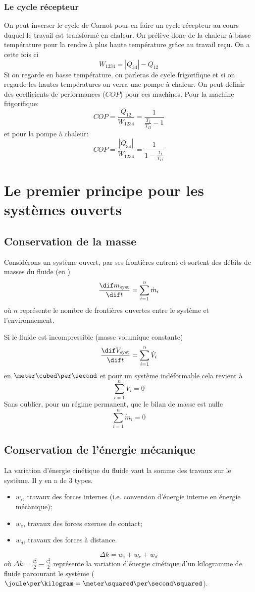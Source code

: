 \subsubsection{Le cycle récepteur}
On peut inverser le cycle de Carnot pour en faire
un cycle récepteur au cours duquel le travail est transformé en chaleur.
On prélève donc de la chaleur à basse température pour
la rendre à plus haute température grâce au travail reçu.
On a cette fois ci
\[ W_{1234} = |Q_{34}|-Q_{12} \]
Si on regarde en basse température, on parleras de cycle frigorifique et
si on regarde les hautes températures on verra une pompe à chaleur.
On peut définir des coefficients de performances ($COP$) pour ces machines.
Pour la machine frigorifique:
\[  COP = \frac {Q_{12}}{W_{1234}} = \frac{1}{\frac{T_I}{T_{II}} -1} \]
et pour la pompe à chaleur:
\[  COP = \frac{|Q_{34}|}{W_{1234}} = \frac {1} {1-\frac{T_I}{T_{II}}} \]

\section{Le premier principe pour les systèmes ouverts}
\subsection{Conservation de la masse}
Considérons un système ouvert, par ses frontières entrent et
sortent des débits de masses du fluide (en \kilogram\per\second)
\[ \frac{\dif m_\mathrm{syst}}{\dif t} = \sum_{i = 1}^{n} \dot m_i \]
où $n$ représente le nombre de frontières ouvertes entre
le système et l'environnement.

Si le fluide est incompressible (masse volumique constante)
\[ \frac{\dif V_\mathrm{syst}}{\dif t} = \sum_{i = 1}^{n}\dot V_i \]
en $\meter\cubed\per\second$ et pour un système indéformable cela revient à
\[  \sum_{i = 1}^n \dot V_i = 0 \]
Sans oublier, pour un régime permanent, que le bilan de masse est nulle
\[ \sum_{i = 1}^n \dot m_i = 0 \]

\subsection{Conservation de l'énergie mécanique}
La variation d'énergie cinétique du fluide vaut
la somme des travaux sur le système.
Il y en a de 3 types.
\begin{itemize}
  \item $w_i$, travaux des forces internes
    (i.e. conversion d'énergie interne en énergie mécanique);
  \item $w_e$, travaux des forces exernes de contact;
  \item $w_d$, travaux des forces à distance.
\end{itemize}
\[ \Delta k = w_i + w_e + w_d \]
où $\Delta k = \frac{c_2^2}{2}-\frac{c_1^2}{2}$ représente la variation
d'énergie cinétique d'un kilogramme de fluide parcourant
le système ($\joule\per\kilogram = \meter\squared\per\second\squared$).

